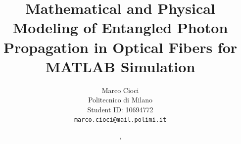 
\title{
Mathematical and Physical Modeling of Entangled Photon Propagation in Optical Fibers for MATLAB Simulation
}

\author{
Marco Cioci\\
Politecnico di Milano\\
Student ID: 10694772\\
\texttt{marco.cioci@mail.polimi.it}
}

\date{\DTMenglishmonthname{\the\month}, \the\year}